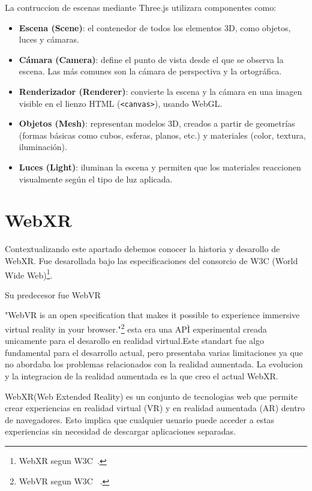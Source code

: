 \documentclass[a4paper, 12pt]{book}
\let\cleardoublepage\clearpage
\begin{document}
La contruccion de escenas mediante Three.js utilizara componentes como:
 
\begin{itemize}
    \item \textbf{Escena (Scene)}: el contenedor de todos los elementos 3D, como objetos, luces y cámaras.
    
    \item \textbf{Cámara (Camera)}: define el punto de vista desde el que se observa la escena. Las más comunes son la cámara de perspectiva y la ortográfica.
    
    \item \textbf{Renderizador (Renderer)}: convierte la escena y la cámara en una imagen visible en el lienzo HTML (\texttt{<canvas>}), usando WebGL.
    
    \item \textbf{Objetos (Mesh)}: representan modelos 3D, creados a partir de geometrías (formas básicas como cubos, esferas, planos, etc.) y materiales (color, textura, iluminación).
    
    \item \textbf{Luces (Light)}: iluminan la escena y permiten que los materiales reaccionen visualmente según el tipo de luz aplicada.
\end{itemize}


\cleardoublepage
\section{WebXR} 
\label{sec:seccion4}
Contextualizando este apartado debemos conocer la historia y desarollo de WebXR. Fue desarollada bajo las especificaciones del consorcio de W3C (World Wide Web)\footnote{WebXR segun W3C~\cite{w3c_webxr}.}.

Su predecesor fue WebVR

"WebVR is an open specification that makes it possible to experience immersive virtual reality in your browser."\footnote{WebVR segun W3C  ~\cite{webvr-spec}.} esta era una APÌ experimental creada unicamente para el desarollo en realidad virtual.Este standart fue algo fundamental para el desarrollo actual, pero presentaba varias limitaciones ya que no abordaba los problemas relacionados con la realidad aumentada. La evolucion y la integracion de la realidad aumentada es la que creo el actual WebXR.

WebXR(Web Extended Reality) es un conjunto de tecnologias web que permite crear experiencias en realidad virtual (VR) y en realidad aumentada (AR) dentro de navegadores. Esto implica que cualquier usuario puede acceder a estas experiencias sin necesidad de descargar aplicaciones separadas.
\end{document}
